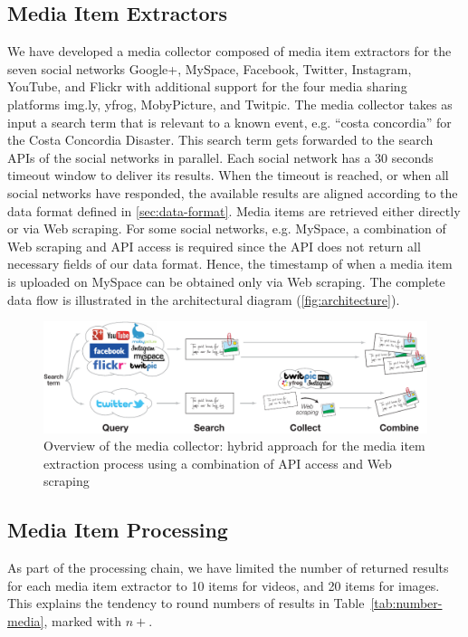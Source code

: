 \documentclass{acm_proc_article-sp}
\begin{document}
\subsection{Media Item Extractors}
We have developed a media collector composed of media item extractors for the seven social networks Google+, MySpace, Facebook, Twitter, Instagram, YouTube, and Flickr with additional support for the four media sharing platforms img.ly, yfrog, MobyPicture, and Twitpic. The media collector takes as input a search term that is relevant to a known event, e.g. ``costa concordia'' for the Costa Concordia Disaster. This search term gets forwarded to the search APIs of the social networks in parallel. Each social network has a 30 seconds timeout window to deliver its results. When the timeout is reached, or when all social networks have responded,
the available results are aligned according to the data format defined in \autoref{sec:data-format}. Media items are retrieved either directly or via Web scraping. For some social networks, e.g. MySpace, a combination of Web scraping and API access is required since the API does not return all necessary fields of our data format. Hence, the timestamp of when a media item is uploaded on MySpace can be obtained only via Web scraping. The complete data flow is illustrated in the architectural diagram (\autoref{fig:architecture}).
\begin{figure}
\centering
\includegraphics[width=1.0\linewidth]{./resources/architecture.pdf}
\caption{Overview of the media collector: hybrid approach for the media item extraction process using a combination of API access and Web scraping}
\label{fig:architecture}
\end{figure}

\subsection{Media Item Processing}
As part of the processing chain, we have limited the number of returned results for each media item extractor to 10 items for videos, and 20 items for images. This explains the tendency to round numbers of results in Table~\ref{tab:number-media}, marked with $n+$.
\end{document}
